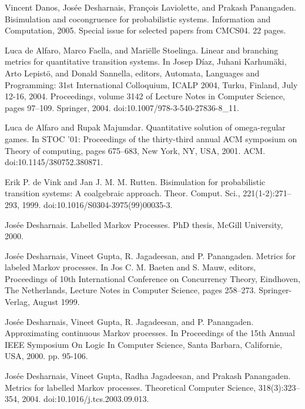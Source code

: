 \par\noindent  [17]  Vincent Danos, Josée Desharnais, François Laviolette, and Prakash Panangaden.  Bisimulation and cocongruence for probabilistic systems.  Information and Computation, 2005.  Special issue for selected papers from CMCS04. 22 pages.  
 
\par\noindent  [18]  Luca de Alfaro, Marco Faella, and Mariëlle Stoelinga.  Linear and branching metrics for quantitative transition systems.  In Josep Díaz, Juhani Karhumäki, Arto Lepistö, and Donald Sannella, editors, Automata, Languages and Programming: 31st International Colloquium, ICALP 2004, Turku, Finland, July 12-16, 2004. Proceedings, volume 3142 of Lecture Notes in Computer Science, pages 97–109. Springer, 2004.  doi:10.1007/978-3-540-27836-8\_11.  
 
\par\noindent  [19]  Luca de Alfaro and Rupak Majumdar.  Quantitative solution of omega-regular games.  In STOC ’01: Proceedings of the thirty-third annual ACM symposium on Theory of computing, pages 675–683, New York, NY, USA, 2001. ACM.  doi:10.1145/380752.380871.  
 
\par\noindent  [20]  Erik P. de Vink and Jan J. M. M. Rutten.  Bisimulation for probabilistic transition systems: A coalgebraic approach.  Theor. Comput. Sci., 221(1-2):271–293, 1999.  doi:10.1016/S0304-3975(99)00035-3.  
 
\par\noindent  [21]  Josée Desharnais.  Labelled Markov Processes.  PhD thesis, McGill University, 2000.  
 
\par\noindent  [22]  Josée Desharnais, Vineet Gupta, R. Jagadeesan, and P. Panangaden.  Metrics for labeled Markov processes.  In Jos C. M. Baeten and S. Mauw, editors, Proceedings of 10th International Conference on Concurrency Theory, Eindhoven, The Netherlands, Lecture Notes in Computer Science, pages 258–273. Springer-Verlag, August 1999.  
 
\par\noindent  [23]  Josée Desharnais, Vineet Gupta, R. Jagadeesan, and P. Panangaden.  Approximating continuous Markov processes.  In Proceedings of the 15th Annual IEEE Symposium On Logic In Computer Science, Santa Barbara, Californie, USA, 2000.  pp. 95-106.  
 
\par\noindent  [24]  Josée Desharnais, Vineet Gupta, Radha Jagadeesan, and Prakash Panangaden.  Metrics for labelled Markov processes.  Theoretical Computer Science, 318(3):323–354, 2004.  doi:10.1016/j.tcs.2003.09.013.  
 
